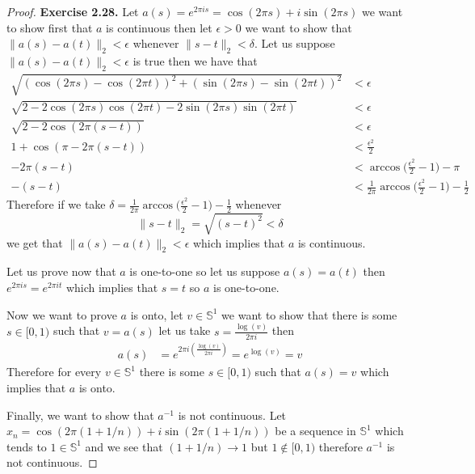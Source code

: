 \documentclass[11pt]{article}
\theoremstyle{definition}
\begin{document}
\cleardoublepage
\begin{proof}{\textbf{Exercise 2.28.}}
    Let $a(s) = e^{2\pi i s} = \cos(2\pi s) + i\sin(2\pi s)$ we want to show
    first that $a$ is continuous then let $\epsilon >0$ we want to show that
    $\|a(s) - a(t)\|_2 < \epsilon$  whenever $\|s - t\|_2 < \delta$. Let
    us suppose $\|a(s) - a(t)\|_2 < \epsilon$ is true then we have that
    \begin{align*}
        \sqrt{(\cos(2\pi s) - \cos(2\pi t))^2 + (\sin(2\pi s) - \sin(2\pi t))^2} &< \epsilon\\
        \sqrt{2 - 2\cos(2\pi s)\cos(2\pi t) - 2\sin(2\pi s)\sin(2\pi t)} &< \epsilon\\
        \sqrt{2 - 2\cos(2\pi (s -t))} &< \epsilon\\
        1 + \cos(\pi - 2\pi (s-t)) &< \frac{\epsilon^2}{2}\\
        -2\pi (s-t) &< \arccos\bigg(\frac{\epsilon^2}{2} - 1\bigg) - \pi\\        
        -(s-t) &< \frac{1}{2\pi}\arccos\bigg(\frac{\epsilon^2}{2} - 1\bigg) - \frac{1}{2}
    \end{align*}
    Therefore if we take $\delta = \frac{1}{2\pi}\arccos\bigg(\frac{\epsilon^2}{2} - 1\bigg) - \frac{1}{2}$
    whenever $$\|s-t\|_2 = \sqrt{(s-t)^2} < \delta$$
    we get that $\|a(s) - a(t)\|_2 < \epsilon$ which implies that $a$ is
    continuous.

    Let us prove now that $a$ is one-to-one so let us suppose $a(s) = a(t)$
    then $e^{2\pi i s} = e^{2\pi i t}$ which implies that $s = t$ so $a$ is
    one-to-one.

    Now we want to prove $a$ is onto, let $v \in \mathbb{S}^1$ we want to show
    that there is some $s \in [0,1)$ such that $v = a(s)$ let us take
    $s = \frac{\log(v)}{2\pi i}$ then
    \begin{align*}
        a(s) &= e^{2\pi i (\frac{\log(v)}{2\pi i})} = e^{\log(v)} = v
    \end{align*}
    Therefore for every $v \in \mathbb{S}^1$ there is some $s \in [0,1)$ such
    that $a(s) = v$ which implies that $a$ is onto.

    Finally, we want to show that $a^{-1}$ is not continuous. Let
    $x_n = \cos(2\pi (1 + 1/n)) + i\sin(2\pi(1 + 1/n))$ be a sequence in
    $\mathbb{S}^1$ which tends to $1 \in \mathbb{S}^1$ and we see that
    $(1 + 1/n) \to 1$ but $1 \not\in [0,1)$ therefore $a^{-1}$ is not
    continuous.
\end{proof}
\end{document}
